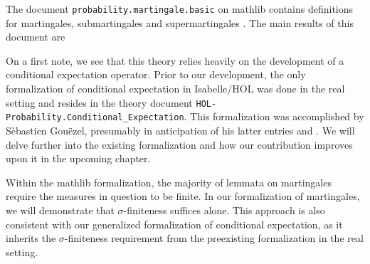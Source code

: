 The document \texttt{probability.martingale.basic} on \textsf{mathlib} contains definitions for martingales, submartingales and supermartingales \cite{Degenne_Ying_2022}. The main results of this document are
\vspace{0.3cm}
\vspace{0.3cm}

On a first note, we see that this theory relies heavily on the development of a conditional expectation operator. Prior to our development, the only formalization of conditional expectation in Isabelle/HOL was done in the real setting and resides in the theory document \texttt{HOL-Probability.Conditional\_Expectation}. This formalization was accomplished by S\`ebastien Gou\"ezel, presumably in anticipation of his latter entries \cite{Ergodic_Theory-AFP} and \cite{Lp-AFP}. We will delve further into the existing formalization and how our contribution improves upon it in the upcoming chapter.

Within the \textsf{mathlib} formalization, the majority of lemmata on martingales require the measures in question to be finite. In our formalization of martingales, we will demonstrate that $\sigma$-finiteness suffices alone. This approach is also consistent with our generalized formalization of conditional expectation, as it inherits the $\sigma$-finiteness requirement from the preexisting formalization in the real setting.

